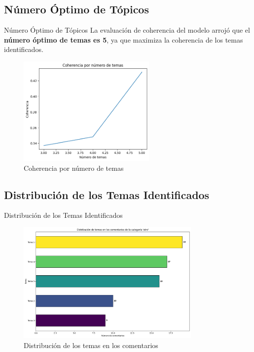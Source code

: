 \documentclass[aspectratio=169, xcolor={dvipsnames}, 10pt, spanish]{beamer}
\begin{document}
\subsection{Número Óptimo de Tópicos}
\begin{frame}{Número Óptimo de Tópicos}
    La evaluación de coherencia del modelo arrojó que el \textbf{número óptimo de temas es 5}, ya que maximiza la coherencia de los temas identificados.

    \vfill
    \begin{figure}[H]
        \centering
        \includegraphics[width=0.6\textwidth]{imagec.png}
        \caption{Coherencia por número de temas}
        \label{fig:coherencia_temas}
    \end{figure}
\end{frame}

\subsection{Distribución de los Temas Identificados}
\begin{frame}{Distribución de los Temas Identificados}
    \begin{figure}[H]
        \centering
        \includegraphics[width=0.8\textwidth]{imaged.png}
        \caption{Distribución de los temas en los comentarios}
        \label{fig:distribucion_temas}
    \end{figure}
\end{frame}
\end{document}
